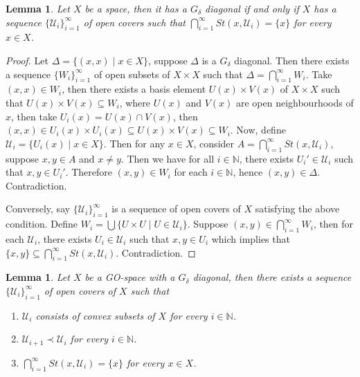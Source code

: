\documentclass[12pt,oneside,english]{amsbook}
\numberwithin{equation}{section} %
\numberwithin{figure}{section} %
\theoremstyle{plain}
\numberwithin{section}{chapter}
\theoremstyle{plain}
\newtheorem{lem}[thm]{Lemma}
\begin{document}
\begin{lem}
  Let $X$ be a space, then it has a $G_{\delta}$ diagonal if and only if $X$ has a sequence $\{\mathcal{U}_{i}\}_{i = 1}^{\infty}$ of open covers such that $\bigcap_{i = 1}^{\infty}St(x, \mathcal{U}_{i}) = \{x\}$ for every $x \in X$.
\end{lem}
\begin{proof}
  Let $\Delta = \{ (x,x) \; | \; x \in X \}$, suppose $\Delta$ is a $G_{\delta}$ diagonal. Then there exists a sequence $\{W_{i}\}_{i = 1}^{\infty}$ of open subsets of $X \times X$ such that $\Delta = \bigcap_{i = 1}^{\infty}W_{i}$. Take $(x,x) \in W_{i}$, then there exists a basis element $U(x) \times V(x)$ of $X \times X$ such that  $U(x) \times V(x) \subseteq W_{i}$, where $U(x)$ and $V(x)$ are open neighbourhoods of $x$, then take $U_{i}(x) = U(x) \cap V(x)$, then $(x,x) \in U_{i}(x) \times U_{i}(x) \subseteq U(x) \times V(x) \subseteq W_{i}$. Now, define $ \mathcal{U}_{i} = \{ U_{i}(x) \; | \; x \in X \}$. Then for any $x \in X$, consider $A = \bigcap_{i = 1}^{\infty} St(x, \mathcal{U}_{i})$, suppose $x,y \in A$ and $x \neq y$. Then we have for all $i \in \mathbb{N}$, there exists $U_{i}' \in \mathcal{U}_{i}$ such that $x,y \in U_{i}'$. Therefore $(x,y) \in W_{i}$ for each $i \in \mathbb{N}$, hence $(x,y) \in \Delta$. Contradiction.

  Conversely, say $\{\mathcal{U}_{i}\}_{i = 1}^{\infty}$ is a sequence of open covers of $X$ satisfying the above condition. Define $W_{i} = \bigcup\{U \times U \; | \; U \in \mathcal{U}_{i} \}$. Suppose $(x,y) \in \bigcap_{i = 1}^{\infty}W_{i}$, then for each $\mathcal{U}_{i}$, there exists $U_{i} \in \mathcal{U}_{i}$ such that $x,y \in U_{i}$ which implies that $ \{x,y \} \subseteq \bigcap_{i = 1}^{\infty}St(x, \mathcal{U}_{i})$. Contradiction.
\end{proof}

\begin{lem}
  Let $X$ be a GO-space with a $G_{\delta}$ diagonal, then there exists a sequence $\{ \mathcal{U}_{i} \}_{i = 1}^{\infty}$ of open covers of $X$ such that
  \begin{enumerate}
  \item $\mathcal{U}_{i}$ consists of convex subsets of $X$ for every $i \in \mathbb{N}$.
  \item $\mathcal{U}_{i+1} \prec \mathcal{U}_{i}$ for every $i \in \mathbb{N}$.
  \item $\bigcap_{i = 1}^{\infty} St(x, \mathcal{U}_{i}) = \{ x \}$ for every $x \in X$.
  \end{enumerate}
\end{lem}
\end{document}
